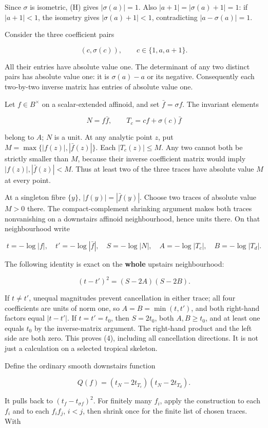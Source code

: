 \documentclass[
  11pt,
]{article}
\begin{document}
Since \(\sigma\) is isometric, (H) gives \(|\sigma(a)|=1\). Also
\(|a+1|=|\sigma(a)+1|=1\): if \(|a+1|<1\), the isometry gives
\(|\sigma(a)+1|<1\), contradicting \(|a-\sigma(a)|=1\).

Consider the three coefficient pairs

\[ (c,\sigma(c)),\qquad c\in\{1,a,a+1\}.\]

All their entries have absolute value one. The determinant of any two
distinct pairs has absolute value one: it is \(\sigma(a)-a\) or its
negative. Consequently each two-by-two inverse matrix has entries of
absolute value one.

Let \(f\in B^\times\) on a scalar-extended affinoid, and set
\(\bar f=\sigma f\). The invariant elements

\[N=f\bar f,\qquad T_c=cf+\sigma(c)\bar f\]

belong to \(A\); \(N\) is a unit. At any analytic point \(z\), put
\(M=\max\{|f(z)|,|\bar f(z)|\}\). Each \(|T_c(z)|\leq M\). Any two
cannot both be strictly smaller than \(M\), because their inverse
coefficient matrix would imply \(|f(z)|,|\bar f(z)|<M\). Thus at least
two of the three traces have absolute value \(M\) at every point.

At a singleton fibre \(\{y\}\), \(|f(y)|=|\bar f(y)|\). Choose two
traces of absolute value \(M>0\) there. The compact-complement shrinking
argument makes both traces nonvanishing on a downstairs affinoid
neighbourhood, hence units there. On that neighbourhood write

\[
t=-\log|f|,\quad t'=-\log|\bar f|,\quad S=-\log|N|,
\quad A=-\log|T_c|,\quad B=-\log|T_d|.
\]

The following identity is exact on the \textbf{whole} upstairs
neighbourhood:

\[
(t-t')^2=(S-2A)(S-2B). \tag{4}
\]

If \(t\ne t'\), unequal magnitudes prevent cancellation in either trace;
all four coefficients are units of norm one, so \(A=B=\min(t,t')\), and
both right-hand factors equal \(|t-t'|\). If \(t=t'=t_0\), then
\(S=2t_0\), both \(A,B\geq t_0\), and at least one equals \(t_0\) by the
inverse-matrix argument. The right-hand product and the left side are
both zero. This proves (4), including all cancellation directions. It is
not just a calculation on a selected tropical skeleton.

Define the ordinary smooth downstairs function

\[Q(f)=(t_N-2t_{T_c})(t_N-2t_{T_d}).\]

It pulls back to \((t_f-t_{\sigma f})^2\). For finitely many \(f_i\),
apply the construction to each \(f_i\) and to each \(f_if_j\), \(i<j\),
then shrink once for the finite list of chosen traces. With
\end{document}
